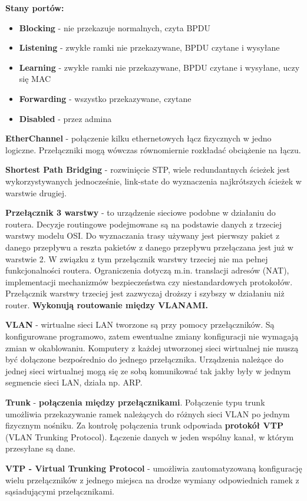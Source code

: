 \documentclass[../main.tex]{subfiles}
\begin{document}
    \textbf{Stany portów:}
    \begin{itemize}
        \item \textbf{Blocking} - nie przekazuje normalnych, czyta BPDU
        \item \textbf{Listening} - zwykłe ramki nie przekazywane, BPDU czytane i wysyłane
        \item \textbf{Learning} - zwykłe ramki nie przekazywane, BPDU czytane i wysyłane, uczy się MAC
        \item \textbf{Forwarding} - wszystko przekazywane, czytane
        \item \textbf{Disabled} - przez admina
    \end{itemize}

    \textbf{EtherChannel} - połączenie kilku ethernetowych łącz fizycznych w jedno logiczne.
    Przełączniki mogą wówczas równomiernie rozkładać obciążenie na łączu.

    \textbf{Shortest Path Bridging} - rozwinięcie STP, wiele redundantnych ścieżek jest
    wykorzystywanych jednocześnie, link-state do wyznaczenia najkrótszych ścieżek w warstwie
    drugiej.

    \textbf{Przełącznik 3 warstwy} - to urządzenie sieciowe podobne w działaniu do
    routera. Decyzje routingowe podejmowane są na podstawie danych z trzeciej warstwy modelu
    OSI. Do wyznaczania trasy używany jest pierwszy pakiet z danego przepływu a reszta
    pakietów z danego przepływu przełączana jest już w warstwie 2. W związku z tym przełącznik
    warstwy trzeciej nie ma pełnej funkcjonalności routera. Ograniczenia dotyczą m.in.
    translacji adresów (NAT), implementacji mechanizmów bezpieczeństwa czy niestandardowych
    protokołów. Przełącznik warstwy trzeciej jest zazwyczaj droższy i szybszy w działaniu
    niż router. \textbf{Wykonują routowanie między VLANAMI.}

    \textbf{VLAN} - wirtualne sieci LAN tworzone są przy pomocy przełączników. Są
    konfigurowane programowo, zatem ewentualne zmiany konfiguracji nie wymagają zmian w
    okablowaniu. Komputery z każdej utworzonej sieci wirtualnej nie muszą być dołączone
    bezpośrednio do jednego przełącznika. Urządzenia należące do jednej sieci wirtualnej
    mogą się ze sobą komunikować tak jakby były w jednym segmencie sieci LAN, działa np. ARP.

    \textbf{Trunk} - \textbf{połączenia między przełącznikami}.
    Połączenie typu trunk umożliwia przekazywanie ramek należących do różnych sieci VLAN
    po jednym fizycznym nośniku. Za kontrolę połączenia trunk odpowiada \textbf{protokół VTP}
    (VLAN Trunking Protocol). Łączenie danych w jeden wspólny kanał, w którym przesyłane
    są dane.

    \textbf{VTP - Virtual Trunking Protocol} - umożliwia zautomatyzowaną konfigurację
    wielu przełączników z jednego miejsca na drodze wymiany odpowiednich ramek z
    sąsiadującymi przełącznikami.
\end{document}
